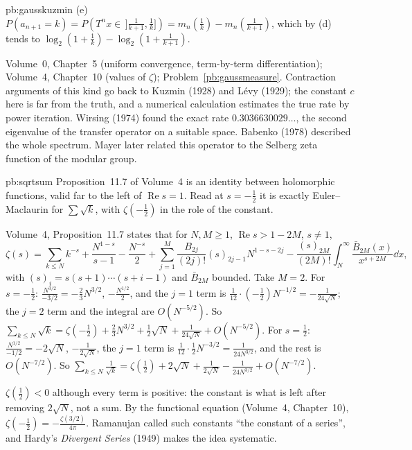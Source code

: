 \begin{solution}{pb:gausskuzmin}
(e) $P(a_{n+1}=k)=P(T^nx\in\,]\frac1{k+1},\frac1k])=m_n(\frac1k)-m_n(\frac1{k+1})$, which by (d) tends to
$\log_2(1+\frac1k)-\log_2(1+\frac1{k+1})$.

\tools Volume~0, Chapter~5 (uniform convergence, term-by-term differentiation); Volume~4, Chapter~10 (values of $\zeta$); Problem~\ref{pb:gaussmeasure}.
\leads Contraction arguments of this kind go back to Kuzmin (1928) and Lévy (1929); the constant $c$ here is far from the
truth, and a numerical calculation estimates the true rate by power iteration. Wirsing (1974) found the exact rate $0.3036630029\ldots$, the second eigenvalue of the transfer
operator on a suitable space. Babenko (1978) described the whole spectrum. Mayer later related this operator to the Selberg zeta
function of the modular group.
\end{solution}

\begin{solution}{pb:sqrtsum}
\idea Proposition~11.7 of Volume~4 is an identity between holomorphic functions, valid far to the left of $\operatorname{Re}s=1$. Read at $s=-\frac12$ it is exactly Euler--Maclaurin for $\sum\sqrt k$, with $\zeta(-\frac12)$
in the role of the constant.

\writeup Volume~4, Proposition~11.7 states that for $N,M\ge1$, $\operatorname{Re}s>1-2M$, $s\ne1$,
\[
\zeta(s)=\sum_{k\le N}k^{-s}+\frac{N^{1-s}}{s-1}-\frac{N^{-s}}2+\sum_{j=1}^M\frac{B_{2j}}{(2j)!}(s)_{2j-1}N^{1-s-2j}-\frac{(s)_{2M}}{(2M)!}\int_N^\infty\frac{\bar B_{2M}(x)}{x^{s+2M}}\dd x,
\]
with $(s)_i=s(s+1)\cdots(s+i-1)$ and $\bar B_{2M}$ bounded. Take $M=2$. For $s=-\frac12$: $\frac{N^{3/2}}{-3/2}=-\frac23N^{3/2}$, $-\frac{N^{1/2}}2$, and the $j=1$ term is $\frac1{12}\cdot(-\frac12)N^{-1/2}=-\frac1{24\sqrt N}$; the $j=2$ term
and the integral are $O(N^{-5/2})$. So $\sum_{k\le N}\sqrt k=\zeta(-\frac12)+\frac23N^{3/2}+\frac12\sqrt N+\frac1{24\sqrt N}+O(N^{-5/2})$. For $s=\frac12$: $\frac{N^{1/2}}{-1/2}=-2\sqrt N$, $-\frac1{2\sqrt N}$, the $j=1$ term is
$\frac1{12}\cdot\frac12N^{-3/2}=\frac1{24N^{3/2}}$, and the rest is $O(N^{-7/2})$. So $\sum_{k\le N}\frac1{\sqrt k}=\zeta(\frac12)+2\sqrt N+\frac1{2\sqrt N}-\frac1{24N^{3/2}}+O(N^{-7/2})$.

\leads $\zeta(\frac12)<0$ although every term is positive: the constant is what is left after removing $2\sqrt N$, not a sum. By the functional equation (Volume~4, Chapter~10),
$\zeta(-\frac12)=-\frac{\zeta(3/2)}{4\pi}$. Ramanujan called such constants ``the constant of a series'', and Hardy's \emph{Divergent Series} (1949) makes the idea systematic.
\end{solution}

